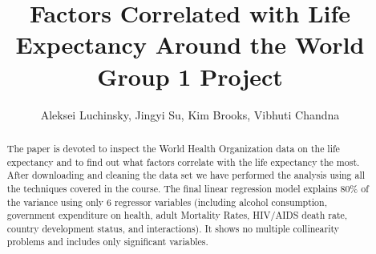 \documentclass{article}
\begin{document}
\begin{titlepage}
\thispagestyle{empty}
\title{Factors Correlated with Life Expectancy Around the World\\
\large Group 1 Project}
\author{Aleksei Luchinsky, Jingyi Su, Kim Brooks, Vibhuti Chandna}
\date{}
\maketitle
\begin{abstract}
  The paper is devoted to inspect the World Health Organization data on the life expectancy and to find out what factors correlate with the life expectancy the most. After downloading and cleaning the data set we have performed the analysis using all the techniques covered in the course. The final linear regression model explains 80\% of the variance using only 6 regressor variables (including alcohol consumption, government expenditure on health, adult Mortality Rates, HIV/AIDS death rate, country development status, and interactions). It shows no multiple collinearity problems and includes only significant variables.
\end{abstract}
\tableofcontents  
\end{titlepage}

\clearpage\newpage
\setcounter{page}{1}

\doublespacing 







\let\Section\section 
\def\section*#1{\Section{#1}} 


\end{document}
